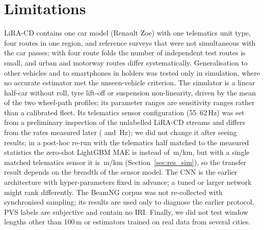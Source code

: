 \section{Limitations}
\label{sec:limitations}
LiRA-CD contains one car model (Renault Zoe) with one telematics unit type, four routes in one region, and reference surveys that were not simultaneous with the car passes; with four route folds the number of independent test routes is small, and urban and motorway routes differ systematically.
Generalisation to other vehicles and to smartphones in holders was tested only in simulation, where no accurate estimator met the unseen-vehicle criterion.
The simulator is a linear half-car without roll, tyre lift-off or suspension non-linearity, driven by the mean of the two wheel-path profiles; its parameter ranges are sensitivity ranges rather than a calibrated fleet.
Its telematics sensor configuration (55--62\,Hz) was set from a preliminary inspection of the unlabelled LiRA-CD streams and differs from the rates measured later (\liraRateLow{} and \liraRateHigh\,Hz); we did not change it after seeing results; in a post-hoc re-run with the telematics half matched to the measured statistics the zero-shot LightGBM MAE is \phMixGbmMae{} instead of \phPrimGbmMae\,m/km, but with a single matched telematics sensor it is \phMeasGbmMae\,m/km (Section~\ref{sec:res_sim}), so the transfer result depends on the breadth of the sensor model.
The CNN is the earlier architecture with hyper-parameters fixed in advance; a tuned or larger network might rank differently.
The BeamNG corpus was not re-collected with synchronised sampling; its results are used only to diagnose the earlier protocol.
PVS labels are subjective and contain no IRI.
Finally, we did not test window lengths other than 100\,m or estimators trained on real data from several cities.
